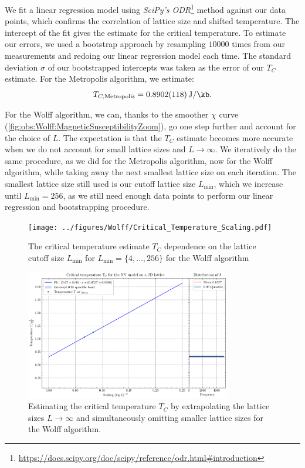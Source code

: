 		We fit a linear regression model using \emph{SciPy's ODR}\footnote{\url{https://docs.scipy.org/doc/scipy/reference/odr.html\#introduction}} method against our data points, which confirms the correlation of lattice size and shifted temperature. The intercept of the fit gives the estimate for the critical temperature. To estimate our errors, we used a bootstrap approach by resampling $\num{10 000}$ times from our measurements and redoing our linear regression model each time. The standard deviation $\sigma$ of our bootstrapped intercepts was taken as the error of our $T_C$ estimate. For the Metropolis algorithm, we estimate:
		\begin{equation}
			T_{C, \text{Metropolis}} = \SI{0.8902(118)}{\J\per\kb}.
		\end{equation}
		
		For the Wolff algorithm, we can, thanks to the smoother $\chi$ curve (\cref{fig:obs:Wolff:MagneticSusceptibilityZoom}), go one step further and account for the choice of $L$. The expectation is that the $T_C$ estimate becomes more accurate when we do not account for small lattice sizes and $L \rightarrow \infty$. We iteratively do the same procedure, as we did for the Metropolis algorithm, now for the Wolff algorithm, while taking away the next smallest lattice size on each iteration. The smallest lattice size still used is our cutoff lattice size $L_\text{min}$, which we increase until $L_\text{min} = 256$, as we still need enough data points to perform our linear regression and bootstrapping procedure.
		
		\begin{figure}[htbp]
			\centering
			\texttt{[image: ../figures/Wolff/Critical\_Temperature\_Scaling.pdf]}
			\caption[Estimating $T_C$ by accounting for the cutoff lattice sizes $L_\text{min}$]{The critical temperature estimate $T_C$ dependence on the lattice cutoff size $L_\text{min}$ for $L_\text{min} = \{4, \dots, 256\}$ for the Wolff algorithm}
			\label{fig:critical_temperature_scaling}
		\end{figure}
		\begin{figure}[htbp]
			\centering
			\includegraphics[width=0.8\textwidth]{../figures/Wolff/Critical_Temperature.pdf}
			\caption[Estimating $T_C$ by extrapolating the lattice size $L \rightarrow \infty$]{Estimating the critical temperature $T_C$ by extrapolating the lattice sizes $L \rightarrow \infty$ and simultaneously omitting smaller lattice sizes for the Wolff algorithm.}
			\label{fig:critical_temperature:wolff}
		\end{figure}
		
